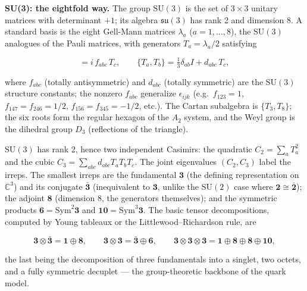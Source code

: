 \medskip\noindent\textbf{SU(3): the eightfold way.} The group $\mathrm{SU}(3)$ is the set of $3\times3$ unitary matrices with determinant $+1$; its algebra $\mathfrak{su}(3)$ has rank 2 and dimension 8. A standard basis is the eight Gell-Mann matrices $\lambda_{a}$ ($a=1,\ldots,8$), the $\mathrm{SU}(3)$ analogues of the Pauli matrices, with generators $T_{a}=\lambda_{a}/2$ satisfying
\begin{linenomath}
\begin{equation}
[T_{a},T_{b}]=i\,f_{abc}\,T_{c},\qquad \{T_{a},T_{b}\}=\tfrac13\delta_{ab}I+d_{abc}\,T_{c},
\label{eq:su3-algebra}
\end{equation}
\end{linenomath}
where $f_{abc}$ (totally antisymmetric) and $d_{abc}$ (totally symmetric) are the $\mathrm{SU}(3)$ structure constants; the nonzero $f_{abc}$ generalize $\epsilon_{ijk}$ (e.g.\ $f_{123}=1$, $f_{147}=f_{246}=1/2$, $f_{156}=f_{345}=-1/2$, etc.). The Cartan subalgebra is $\{T_{3},T_{8}\}$; the six roots form the regular hexagon of the $A_{2}$ system, and the Weyl group is the dihedral group $D_{3}$ (reflections of the triangle).

$\mathrm{SU}(3)$ has rank 2, hence two independent Casimirs: the quadratic $C_{2}=\sum_{a}T_{a}^{2}$ and the cubic $C_{3}=\sum_{abc}d_{abc}T_{a}T_{b}T_{c}$. The joint eigenvalues $(C_{2},C_{3})$ label the irreps. The smallest irreps are the fundamental $\mathbf{3}$ (the defining representation on $\mathbb C^{3}$) and its conjugate $\bar{\mathbf{3}}$ (inequivalent to $\mathbf{3}$, unlike the $\mathrm{SU}(2)$ case where $\mathbf{2}\cong\bar{\mathbf{2}}$); the adjoint $\mathbf{8}$ (dimension 8, the generators themselves); and the symmetric products $\mathbf{6}=\mathrm{Sym}^{2}\mathbf{3}$ and $\mathbf{10}=\mathrm{Sym}^{3}\mathbf{3}$. The basic tensor decompositions, computed by Young tableaux or the Littlewood--Richardson rule, are
\begin{linenomath}
\begin{equation}
\mathbf{3}\otimes\bar{\mathbf{3}}=\mathbf{1}\oplus\mathbf{8},\qquad
\mathbf{3}\otimes\mathbf{3}=\bar{\mathbf{3}}\oplus\mathbf{6},\qquad
\mathbf{3}\otimes\mathbf{3}\otimes\mathbf{3}=\mathbf{1}\oplus\mathbf{8}\oplus\mathbf{8}\oplus\mathbf{10},
\label{eq:su3-decomposition}
\end{equation}
\end{linenomath}
the last being the decomposition of three fundamentals into a singlet, two octets, and a fully symmetric decuplet --- the group-theoretic backbone of the quark model.

